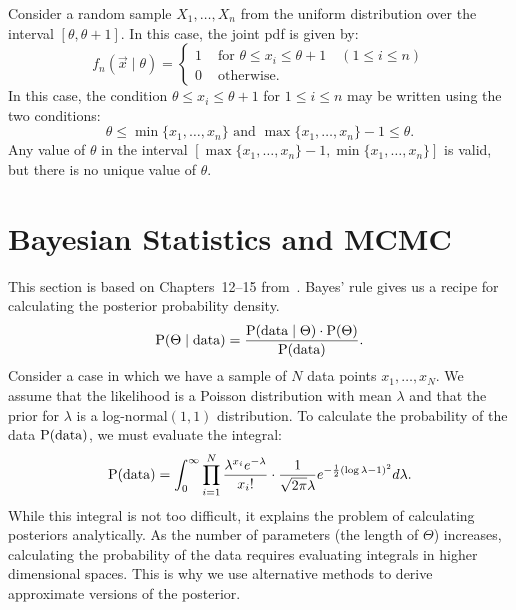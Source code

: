 \begin{example}
Consider a random sample $X_1, \ldots, X_n$ from the uniform distribution 
over the interval $[\theta, \theta + 1]$. In this case, the joint pdf 
is given by:
\[
    f_n(\vec{x} \mid \theta) 
        = \left \{ 
            \begin{array}{ll}
                1  & \text{ for } \theta \leq x_i \leq \theta + 1 \quad (1 \leq i \leq n)\\
                0  & \text{ otherwise}. 
            \end{array}
          \right . 
\]
In this case, the condition $\theta \leq x_i \leq \theta + 1$ for $1 \leq i \leq n$
may be written using the two conditions:
\[
    \theta \leq \min \{x_1, \ldots, x_n\} \text{ and } 
    \max \{x_1, \ldots, x_n \} - 1 \leq \theta.
\]
Any value of $\theta$ in the interval $[\max \{x_1, \ldots, x_n \} - 1, 
\min \{x_1, \ldots, x_n\}]$ is valid, but there is no unique value of $\theta$.
\end{example}

\section{Bayesian Statistics and MCMC}
This section is based on Chapters~12--15 from~\cite{Lam}. Bayes' rule gives us a
 recipe for calculating the posterior probability density. 
\begin{equation}
	\operatorname{P} (\Theta \mid \text{data}) = 
	\frac{\operatorname{P} (\text{data} \mid \Theta) \cdot \operatorname{P} (\Theta)}{\operatorname{P} (\text{data})}.
\end{equation}
Consider a case in which we have a sample of $N$ data points $x_1, \ldots, x_N$. 
We assume that the likelihood is a Poisson distribution with mean $\lambda$ and 
that the prior for $\lambda$ is a log-normal$(1, 1)$ distribution. To calculate 
the probability of the data $\operatorname{P} (\text{data})$, we must evaluate the integral:
\begin{equation}
	\operatorname{P} (\text{data}) = \int_{0}^{\infty} 
		\prod_{i = 1}^N \frac{\lambda^{x_i} e^{- \lambda}}{x_i!} \cdot 
		\frac{1}{\sqrt{2 \pi} \lambda} e^{- \frac{1}{2} (\log \lambda - 1)^2} 
		d\lambda.
\end{equation}
While this integral is not too difficult, it explains the problem of calculating 
posteriors analytically. As the number of parameters (the length of $\Theta$) 
increases, calculating the probability of the data requires evaluating integrals 
in higher dimensional spaces. This is why we use alternative methods to derive 
approximate versions of the posterior.

